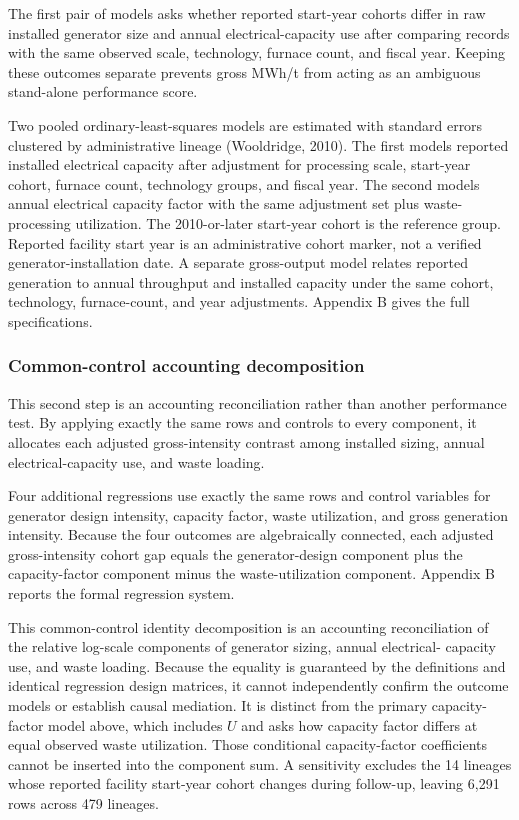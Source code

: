 \documentclass[12pt,letterpaper]{article}
\begin{document}
The first pair of models asks whether reported start-year cohorts differ in raw
installed generator size and annual electrical-capacity use after comparing
records with the same observed scale, technology, furnace count, and fiscal
year. Keeping these outcomes separate prevents gross MWh/t from acting as an
ambiguous stand-alone performance score.

Two pooled ordinary-least-squares models are estimated with standard errors clustered by administrative lineage (Wooldridge, 2010). The first models reported installed electrical capacity after adjustment for processing scale, start-year cohort, furnace count, technology groups, and fiscal year. The second models annual electrical capacity factor with the same adjustment set plus waste-processing utilization. The 2010-or-later start-year cohort is the reference group. Reported facility start year is an administrative cohort marker, not a verified generator-installation date. A separate gross-output model relates reported generation to annual throughput and installed capacity under the same cohort, technology, furnace-count, and year adjustments. Appendix B gives the full specifications.

\subsubsection{Common-control accounting decomposition}

This second step is an accounting reconciliation rather than another
performance test. By applying exactly the same rows and controls to every
component, it allocates each adjusted gross-intensity contrast among installed
sizing, annual electrical-capacity use, and waste loading.

Four additional regressions use exactly the same rows and control variables for generator design intensity, capacity factor, waste utilization, and gross generation intensity. Because the four outcomes are algebraically connected, each adjusted gross-intensity cohort gap equals the generator-design component plus the capacity-factor component minus the waste-utilization component. Appendix B reports the formal regression system.

This common-control identity decomposition is an accounting reconciliation of
the relative log-scale components of generator sizing, annual electrical-
capacity use, and waste loading. Because the equality is guaranteed by the
definitions and identical regression design matrices, it cannot independently
confirm the outcome models or establish causal mediation. It is distinct from
the primary capacity-factor model above, which
includes $U$ and asks how capacity factor differs at equal observed waste
utilization. Those conditional capacity-factor coefficients cannot be inserted
into the component sum. A sensitivity excludes the 14 lineages whose reported
facility start-year cohort changes during follow-up, leaving 6,291 rows across 479
lineages.
\end{document}
